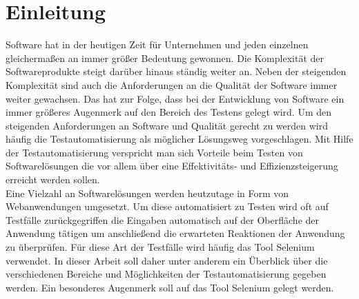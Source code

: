 \chapter{Einleitung}
\label{sec:einleitung}
Software hat in der heutigen Zeit für Unternehmen und jeden einzelnen gleichermaßen an immer größer Bedeutung gewonnen.
Die Komplexität der Softwareprodukte steigt darüber hinaus ständig weiter an. Neben der steigenden Komplexität sind auch die Anforderungen an die Qualität der Software immer weiter gewachsen.
Das hat zur Folge, dass bei der Entwicklung von Software ein immer größeres Augenmerk auf den Bereich des Testens gelegt wird.
Um den steigenden Anforderungen an Software und Qualität gerecht zu werden wird häufig die Testautomatisierung als möglicher Lösungsweg vorgeschlagen.
Mit Hilfe der Testautomatisierung verspricht man sich Vorteile beim Testen von Softwarelösungen die vor allem über eine Effektivitäts- und Effizienzsteigerung erreicht werden sollen.\\
Eine Vielzahl an Softwarelösungen werden heutzutage in Form von Webanwendungen umgesetzt.
Um diese automatisiert zu Testen wird oft auf Testfälle zurückgegriffen die Eingaben automatisch auf der Oberfläche der Anwendung tätigen um anschließend die erwarteten Reaktionen der Anwendung zu überprüfen.
Für diese Art der Testfälle wird häufig das Tool Selenium \cite{selenium_selenium_2015} verwendet.
In dieser Arbeit soll daher unter anderem ein Überblick über die verschiedenen Bereiche und Möglichkeiten der Testautomatisierung gegeben werden. Ein besonderes Augenmerk soll auf das Tool Selenium gelegt werden. \\

